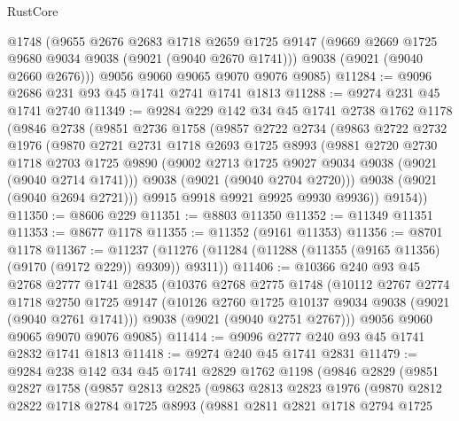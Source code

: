 \begin{lexlean}{RustCore}
\begin{coremodule}
      @1748
      (@9655
        @2676
        @2683
        @1718
        @2659
        @1725
        @9147
        (@9669 @2669 @1725 @9680 @9034 @9038 (@9021 (@9040 @2670 @1741)))
        @9038
        (@9021 (@9040 @2660 @2676)))
      @9056
      @9060
      @9065
      @9070
      @9076
      @9085)
@11284 := @9096 @2686 @231 @93 @45 @1741 @2741 @1741 @1813
@11288 := @9274 @231 @45 @1741 @2740
@11349 := @9284
    @229
    @142
    @34
    @45
    @1741
    @2738
    @1762
    @1178
    (@9846
      @2738
      (@9851
        @2736
        @1758
        (@9857
          @2722
          @2734
          (@9863
            @2722
            @2732
            @1976
            (@9870
              @2721
              @2731
              @1718
              @2693
              @1725
              @8993
              (@9881
                @2720
                @2730
                @1718
                @2703
                @1725
                @9890
                (@9002 @2713 @1725 @9027 @9034 @9038 (@9021 (@9040 @2714 @1741)))
                @9038
                (@9021 (@9040 @2704 @2720)))
              @9038
              (@9021 (@9040 @2694 @2721)))
            @9915
            @9918
            @9921
            @9925
            @9930
            @9936))
        @9154))
@11350 := @8606 @229
@11351 := @8803 @11350
@11352 := @11349 @11351
@11353 := @8677 @1178
@11355 := @11352 (@9161 @11353)
@11356 := @8701 @1178
@11367 := @11237 (@11276 (@11284 (@11288 (@11355 (@9165 @11356) (@9170 (@9172 @229)) @9309)) @9311))
@11406 := @10366
    @240
    @93
    @45
    @2768
    @2777
    @1741
    @2835
    (@10376
      @2768
      @2775
      @1748
      (@10112
        @2767
        @2774
        @1718
        @2750
        @1725
        @9147
        (@10126 @2760 @1725 @10137 @9034 @9038 (@9021 (@9040 @2761 @1741)))
        @9038
        (@9021 (@9040 @2751 @2767)))
      @9056
      @9060
      @9065
      @9070
      @9076
      @9085)
@11414 := @9096 @2777 @240 @93 @45 @1741 @2832 @1741 @1813
@11418 := @9274 @240 @45 @1741 @2831
@11479 := @9284
    @238
    @142
    @34
    @45
    @1741
    @2829
    @1762
    @1198
    (@9846
      @2829
      (@9851
        @2827
        @1758
        (@9857
          @2813
          @2825
          (@9863
            @2813
            @2823
            @1976
            (@9870
              @2812
              @2822
              @1718
              @2784
              @1725
              @8993
              (@9881
                @2811
                @2821
                @1718
                @2794
                @1725

\end{coremodule}
\end{lexlean}
